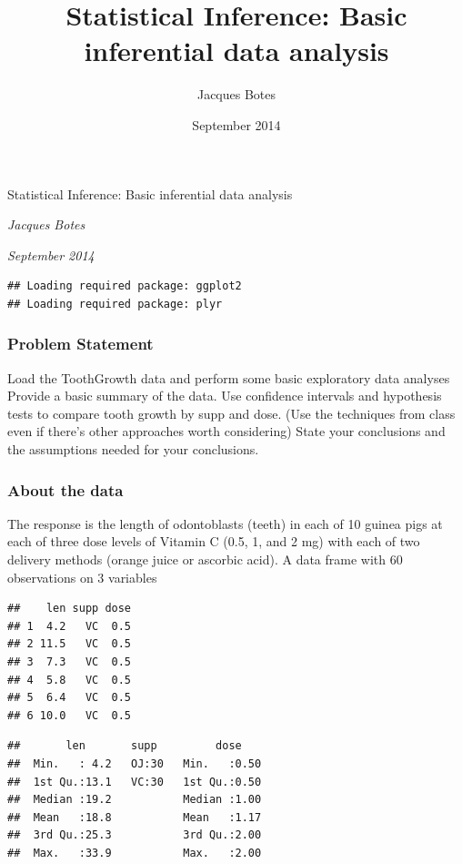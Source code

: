 \documentclass[]{article}
\title{Statistical Inference: Basic inferential data analysis}
\author{Jacques Botes}
\date{September 2014}
\begin{document}
\begin{center}
\huge Statistical Inference: Basic inferential data analysis \\[0.2cm]
\end{center}
\begin{center}
\large \emph{Jacques Botes}\\[0.1cm]
\end{center}
\begin{center}
\large \emph{September 2014} \\
\end{center}
\normalsize


\begin{verbatim}
## Loading required package: ggplot2
## Loading required package: plyr
\end{verbatim}

\subsubsection{Problem Statement}\label{problem-statement}

Load the ToothGrowth data and perform some basic exploratory data
analyses Provide a basic summary of the data. Use confidence intervals
and hypothesis tests to compare tooth growth by supp and dose. (Use the
techniques from class even if there's other approaches worth
considering) State your conclusions and the assumptions needed for your
conclusions.

\subsubsection{About the data}\label{about-the-data}

The response is the length of odontoblasts (teeth) in each of 10 guinea
pigs at each of three dose levels of Vitamin C (0.5, 1, and 2 mg) with
each of two delivery methods (orange juice or ascorbic acid). A data
frame with 60 observations on 3 variables

\begin{verbatim}
##    len supp dose
## 1  4.2   VC  0.5
## 2 11.5   VC  0.5
## 3  7.3   VC  0.5
## 4  5.8   VC  0.5
## 5  6.4   VC  0.5
## 6 10.0   VC  0.5
\end{verbatim}

\begin{verbatim}
##       len       supp         dose     
##  Min.   : 4.2   OJ:30   Min.   :0.50  
##  1st Qu.:13.1   VC:30   1st Qu.:0.50  
##  Median :19.2           Median :1.00  
##  Mean   :18.8           Mean   :1.17  
##  3rd Qu.:25.3           3rd Qu.:2.00  
##  Max.   :33.9           Max.   :2.00
\end{verbatim}
\end{document}

